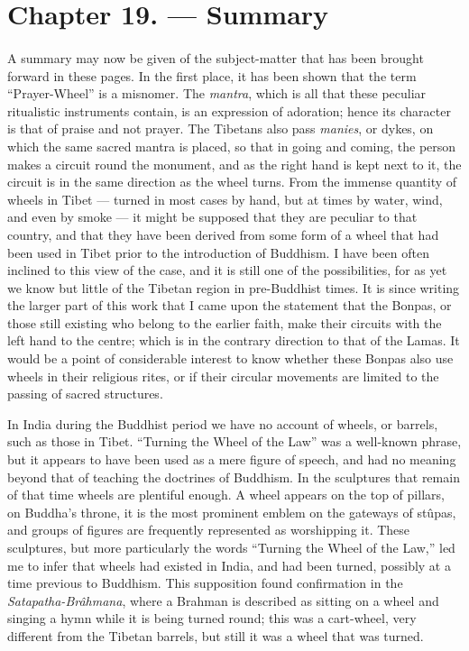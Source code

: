 \documentclass[a4paper, 11pt, oneside, polutonikogreek, english]{article}
\begin{document}
\section{Chapter 19. --- Summary}
\paragraph{}
A summary may now be given of the subject-matter that has been brought forward in these pages. In the first place, it has been shown that the term ``Prayer-Wheel'' is a misnomer. The \emph{mantra}, which is all that these peculiar ritualistic instruments contain, is an expression of adoration; hence its character is that of praise and not prayer. The Tibetans also pass \emph{manies}, or dykes, on which the same sacred mantra is placed, so that in going and coming, the person makes a circuit round the monument, and as the right hand is kept next to it, the circuit is in the same direction as the wheel turns. From the immense quantity of wheels in Tibet --- turned in most cases by hand, but at times by water, wind, and even by smoke --- it might be supposed that they are peculiar to that country, and that they have been derived from some form of a wheel that had been used in Tibet prior to the introduction of Buddhism. I have been often inclined to this view of the case, and it is still one of the possibilities, for as yet we know but little of the Tibetan region in pre-Buddhist times. It is since writing the larger part of this work that I came upon the statement that the Bonpas, or those still existing who belong to the earlier faith, make their circuits with the left hand to the centre; which is in the contrary direction to that of the Lamas. It would be a point of considerable interest to know whether these Bonpas also use wheels in their religious rites, or if their circular movements are limited to the passing of sacred structures.

In India during the Buddhist period we have no account of wheels, or barrels, such as those in Tibet. ``Turning the Wheel of the Law'' was a well-known phrase, but it appears to have been used as a mere figure of speech, and had no meaning beyond that of teaching the doctrines of Buddhism. In the sculptures that remain of that time wheels are plentiful enough. A wheel appears on the top of pillars, on Buddha's throne, it is the most prominent emblem on the gateways of stûpas, and groups of figures are frequently represented as worshipping it. These sculptures, but more particularly the words ``Turning the Wheel of the Law,'' led me to infer that wheels had existed in India, and had been turned, possibly at a time previous to Buddhism. This supposition found confirmation in the \emph{Satapatha-Brâhmana}, where a Brahman is described as sitting on a wheel and singing a hymn while it is being turned round; this was a cart-wheel, very different from the Tibetan barrels, but still it was a wheel that was turned.
\end{document}
